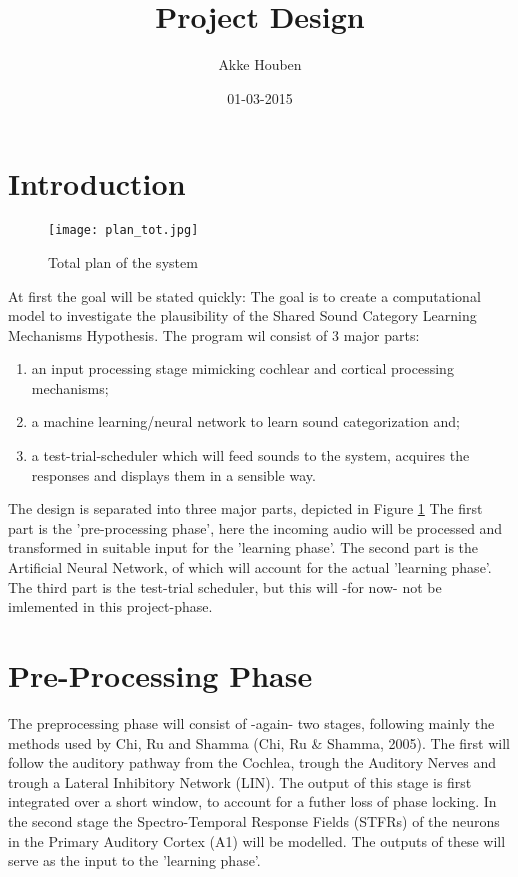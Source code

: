 \documentclass{article}
\title{Project Design}
\author{Akke Houben}
\date{01-03-2015}
\begin{document}
\maketitle
\section{Introduction}
\begin{figure}
	\texttt{[image: plan\_tot.jpg]}
	\caption{Total plan of the system}
	\label{fig:total}
\end{figure}
At first the goal will be stated quickly: The goal is to create a computational model to investigate the plausibility of the Shared Sound Category Learning Mechanisms Hypothesis. The program wil consist of 3 major parts: 
\begin{enumerate}
	\item an input processing stage mimicking cochlear and cortical processing mechanisms; 
	\item a machine learning/neural network to learn sound categorization and; 
	\item a test-trial-scheduler which will feed sounds to the system, acquires the responses and displays them in a sensible way.
\end{enumerate}
The design is separated into three major parts, depicted in Figure \ref{fig:total} The first part is the 'pre-processing phase', here the incoming audio will be processed and transformed in suitable input for the 'learning phase'. The second part is the Artificial Neural Network, of which will account for the actual 'learning phase'. The third part is the test-trial scheduler, but this will -for now- not be imlemented in this project-phase.

\section{Pre-Processing Phase}
The preprocessing phase will consist of -again- two stages, following mainly the methods used by Chi, Ru and Shamma (Chi, Ru \& Shamma, 2005). The first will follow the auditory pathway from the Cochlea, trough the Auditory Nerves and trough a Lateral Inhibitory Network (LIN). The output of this stage is first integrated over a short window, to account for a futher loss of phase locking. In the second stage the Spectro-Temporal Response Fields (STFRs) of the neurons in the Primary Auditory Cortex (A1) will be modelled. The outputs of these will serve as the input to the 'learning phase'.
\end{document}
